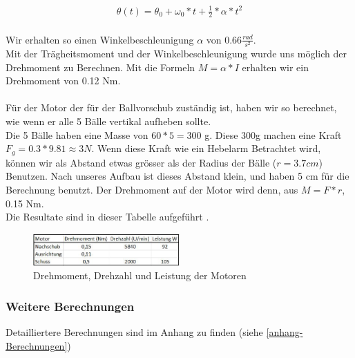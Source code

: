 \begin{gather}
	\theta(t)=\theta_0+\omega_0*t+\frac{1}{2}*\alpha*t^2
\end{gather}\\
Wir erhalten so einen Winkelbeschleunigung $\alpha$ von 0.66$\frac{rad}{s^2}$.\\
Mit der Trägheitsmoment und der Winkelbeschleunigung wurde uns möglich der Drehmoment zu Berechnen.
Mit die Formeln $M=\alpha*I$ erhalten wir ein Drehmoment von 0.12 Nm.\\ \\
Für der Motor der für der Ballvorschub zuständig ist, haben wir so berechnet, wie wenn er alle 5 Bälle vertikal aufheben sollte.\\
Die 5 Bälle haben eine Masse von $60*5=300$ g. Diese 300g machen eine Kraft $F_g=0.3*9.81\approx3 N$. Wenn diese Kraft wie ein Hebelarm Betrachtet wird, können wir als Abstand etwas grösser als der Radius der Bälle ($r=3.7cm$) Benutzen. Nach unseres Aufbau ist dieses Abstand klein, und haben 5 cm für die Berechnung benutzt. Der Drehmoment auf der Motor wird denn, aus $M=F*r$, 0.15 Nm.\\
Die Resultate sind in dieser Tabelle aufgeführt .\\


\begin{figure}[h!]
	\center
	\includegraphics[width=0.5\textwidth]{../../fig/Tabelle_Drehmomente.jpg}
	\caption{Drehmoment, Drehzahl und Leistung der Motoren}
	\label{fig:Drehmoment}
\end{figure} 
\newpage



\subsubsection{Weitere Berechnungen}
Detailliertere Berechnungen sind im Anhang zu finden (siehe \ref{anhang-Berechnungen})